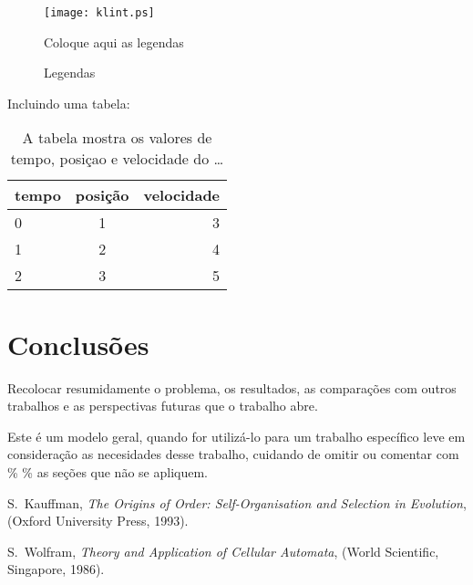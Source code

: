 \begin{figure}[hbtp]
\begin{center}
\texttt{[image: klint.ps]}
\caption{Coloque aqui as legendas}
\label{fig}
\end{center}
\end{figure}
\vspace{0.5cm}

\begin{figure}[htbp]
\begin{center}
\caption{Legendas}
\label{fig_rotacao}
\end{center}
\end{figure}



Incluindo uma tabela:
\begin{table}[h]
\begin{tabular}{||l|c|r||} \hline
tempo& posição & velocidade\\
\hline
0 & 1 & 3\\
 1 & 2 & 4\\
 2 & 3 & 5\\
 \hline
 \end{tabular}
 \caption{A tabela mostra os valores de tempo, posiçao e velocidade do
{\ldots} }
\end{table}

\section{Conclusões}
Recolocar resumidamente o problema, os resultados, as comparações \cite{Wolfram_book} com outros
trabalhos e as perspectivas futuras que o trabalho abre.

{\color{red} Este é um modelo geral, quando for utilizá-lo para um trabalho
específico leve em consideração as necesidades desse trabalho,
cuidando de omitir ou comentar com \% \% as seções que não
se apliquem.}

\begin{thebibliography}{99}

S.~Kauffman, {\em The Origins of Order: Self-Organisation and
Selection in Evolution}, (Oxford University Press, 1993).

S.~Wolfram, {\em Theory and Application of Cellular Automata},
(World Scientific, Singapore, 1986).

\end{thebibliography}



